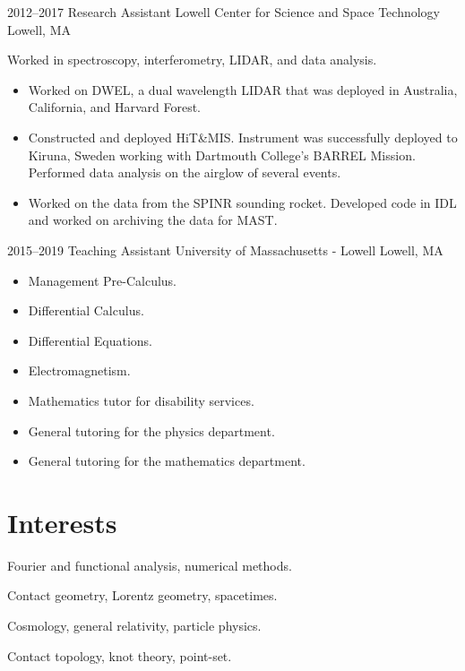 \documentclass[a4paper,sans]{moderncv}
\begin{document}
        \cventry%
            {2012--2017}
            {Research Assistant}
            {Lowell Center for Science and Space Technology}
            {Lowell, MA}
            {}
            {%
                Worked in spectroscopy, interferometry,
                LIDAR, and data analysis.
                \begin{itemize}
                    \item
                        Worked on DWEL, a dual wavelength LIDAR that was
                        deployed in Australia, California, and Harvard Forest.
                    \item
                        Constructed and deployed HiT\&MIS.
                        Instrument was successfully deployed to Kiruna,
                        Sweden working with Dartmouth College's BARREL
                        Mission. Performed data analysis on the airglow of
                        several events.
                    \item
                        Worked on the data from the SPINR sounding rocket.
                        Developed code in IDL and worked on archiving the
                        data for MAST.
                \end{itemize}%
             }
        \cventry%
            {2015--2019}
            {Teaching Assistant}
            {University of Massachusetts - Lowell}
            {Lowell, MA}
            {}
            {%
                \begin{itemize}
                    \item
                        Management Pre-Calculus.
                    \item
                        Differential Calculus.
                    \item
                        Differential Equations.
                    \item
                        Electromagnetism.
                    \item
                        Mathematics tutor for disability services.
                    \item
                        General tutoring for the physics department.
                    \item
                        General tutoring for the mathematics department.
                \end{itemize}%
            }
    \section{Interests}
            Fourier and functional analysis, numerical methods.\par
            Contact geometry, Lorentz geometry, spacetimes.\par
            Cosmology, general relativity, particle physics.\par
            Contact topology, knot theory, point-set.
\end{document}
